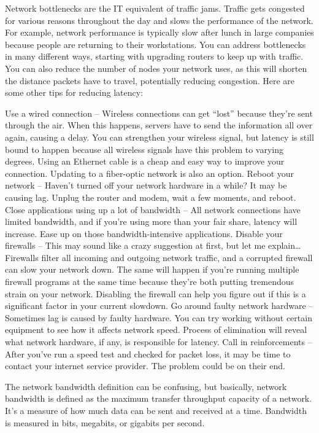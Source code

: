 Network bottlenecks are the IT equivalent of traffic jams. Traffic gets congested for various reasons throughout the day and slows the performance of the network. For example, network performance is typically slow after lunch in large companies because people are returning to their workstations. You can address bottlenecks in many different ways, starting with upgrading routers to keep up with traffic. You can also reduce the number of nodes your network uses, as this will shorten the distance packets have to travel, potentially reducing congestion.
Here are some other tips for reducing latency:

Use a wired connection – Wireless connections can get “lost” because they’re sent through the air. When this happens, servers have to send the information all over again, causing a delay. You can strengthen your wireless signal, but latency is still bound to happen because all wireless signals have this problem to varying degrees. Using an Ethernet cable is a cheap and easy way to improve your connection. Updating to a fiber-optic network is also an option.
Reboot your network – Haven’t turned off your network hardware in a while? It may be causing lag. Unplug the router and modem, wait a few moments, and reboot.
Close applications using up a lot of bandwidth – All network connections have limited bandwidth, and if you’re using more than your fair share, latency will increase. Ease up on those bandwidth-intensive applications.
Disable your firewalls – This may sound like a crazy suggestion at first, but let me explain… Firewalls filter all incoming and outgoing network traffic, and a corrupted firewall can slow your network down. The same will happen if you’re running multiple firewall programs at the same time because they’re both putting tremendous strain on your network. Disabling the firewall can help you figure out if this is a significant factor in your current slowdown.
Go around faulty network hardware – Sometimes lag is caused by faulty hardware. You can try working without certain equipment to see how it affects network speed. Process of elimination will reveal what network hardware, if any, is responsible for latency.
Call in reinforcements – After you’ve run a speed test and checked for packet loss, it may be time to contact your internet service provider. The problem could be on their end.

The network bandwidth definition can be confusing, but basically, network bandwidth is defined as the maximum transfer throughput capacity of a network. It’s a measure of how much data can be sent and received at a time. Bandwidth is measured in bits, megabits, or gigabits per second.

